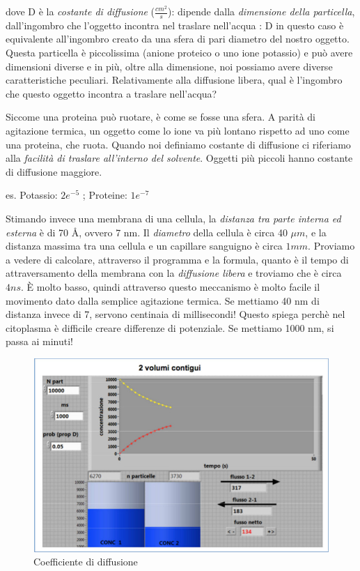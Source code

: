 \documentclass[a4paper,12pt]{article}
\begin{document}
dove D è la \emph{costante di diffusione} ($\frac{cm^{2}}{s}$): dipende dalla \emph{dimensione della particella}, dall'ingombro che l'oggetto incontra nel traslare nell'acqua : D in questo caso è equivalente all'ingombro creato da una sfera di pari diametro del nostro oggetto. Questa particella è piccolissima (anione proteico o uno ione potassio) e può avere dimensioni diverse e in più, oltre alla dimensione, noi possiamo avere diverse caratteristiche peculiari. 
Relativamente alla diffusione libera, qual è l'ingombro che questo oggetto incontra a traslare nell'acqua?

Siccome una proteina può ruotare, è come se fosse una sfera. A parità di agitazione termica, un oggetto come lo ione va più lontano rispetto ad uno come una proteina, che ruota.
Quando noi definiamo costante di diffusione ci riferiamo alla \emph{facilità di traslare all'interno del solvente}.
Oggetti più piccoli hanno costante di diffusione maggiore. 

es. Potassio: $2e^{-5}$ ; Proteine: $1e^{-7}$

Stimando invece una membrana di una cellula, la \emph{distanza tra parte interna ed esterna} è di 70 \AA, ovvero 7 nm.
Il \emph{diametro} della cellula è circa 40 $\mu m $, e la distanza massima tra una cellula e un capillare sanguigno è circa $1 mm$.
Proviamo a vedere di calcolare, attraverso il programma e la formula, quanto è il tempo di attraversamento della membrana con la \emph{diffusione libera} e troviamo che è circa $4 ns$.
 È molto basso, quindi attraverso questo meccanismo è molto facile il movimento dato dalla semplice agitazione termica. Se mettiamo 40 nm di distanza invece di 7, servono centinaia di millisecondi! Questo spiega perchè nel citoplasma è difficile creare differenze di potenziale. Se mettiamo 1000 nm, si passa ai minuti!
\begin{figure}[H]
\centering
\includegraphics[scale=0.5]{immagine/diff.jpg}
\caption{Coefficiente di diffusione}
\end{figure}
\end{document}
